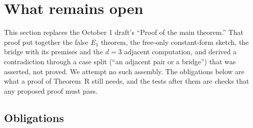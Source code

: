 \documentclass[a4paper,11pt]{article}
\theoremstyle{jsplain}
\theoremstyle{jsdef}
\theoremstyle{jsrem}
\begin{document}
\section{What remains open}\label{td:sec:open}

This section replaces the October 1 draft's ``Proof of the main theorem.'' That proof put together
the false $E_1$ theorem, the free-only constant-form sketch, the bridge with its premises and the
$d = 3$ adjacent computation, and derived a contradiction through a case split (``an adjacent pair
or a bridge'') that was asserted, not proved. We attempt no such assembly. The obligations below are
what a proof of Theorem~R still needs, and the tests after them are checks that any proposed proof
must pass.

\subsection{Obligations}
\end{document}
